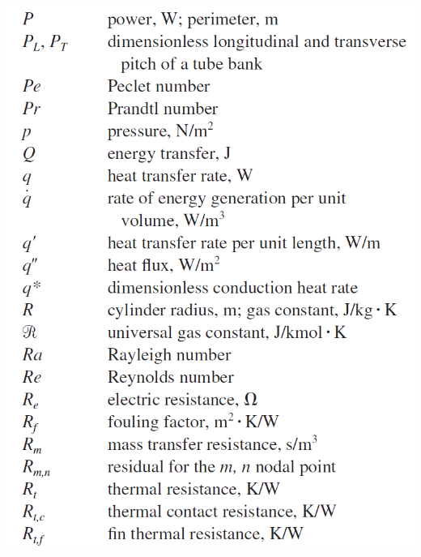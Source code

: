 \documentclass[10pt,landscape]{article}
\newenvironment{Figure}
     {\par\medskip\noindent\minipage{\linewidth}}
     {\endminipage\par\medskip}
\begin{document}
\begin{multicols}{3}
\begin{Figure}
    \includegraphics[width=\linewidth]{Symbols_4.png}
\end{Figure}
\begin{Figure}
    \centering

\end{Figure}
\end{multicols}
\end{document}
